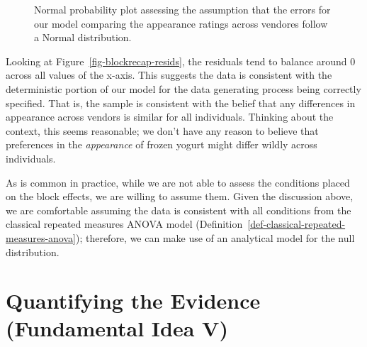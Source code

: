 \documentclass[
  letterpaper,
  DIV=11,
  numbers=noendperiod]{scrreprt}
\theoremstyle{definition}
\theoremstyle{definition}
\theoremstyle{plain}
\theoremstyle{remark}
\begin{document}
\begin{figure}


\caption{\label{fig-blockrecap-probplot}Normal probability plot
assessing the assumption that the errors for our model comparing the
appearance ratings across vendores follow a Normal distribution.}

\end{figure}%

Looking at Figure~\ref{fig-blockrecap-resids}, the residuals tend to
balance around 0 across all values of the x-axis. This suggests the data
is consistent with the deterministic portion of our model for the data
generating process being correctly specified. That is, the sample is
consistent with the belief that any differences in appearance across
vendors is similar for all individuals. Thinking about the context, this
seems reasonable; we don't have any reason to believe that preferences
in the \emph{appearance} of frozen yogurt might differ wildly across
individuals.

As is common in practice, while we are not able to assess the conditions
placed on the block effects, we are willing to assume them. Given the
discussion above, we are comfortable assuming the data is consistent
with all conditions from the classical repeated measures ANOVA model
(Definition~\ref{def-classical-repeated-measures-anova}); therefore, we
can make use of an analytical model for the null distribution.

\section{Quantifying the Evidence (Fundamental Idea
V)}\label{quantifying-the-evidence-fundamental-idea-v-2}
\end{document}
